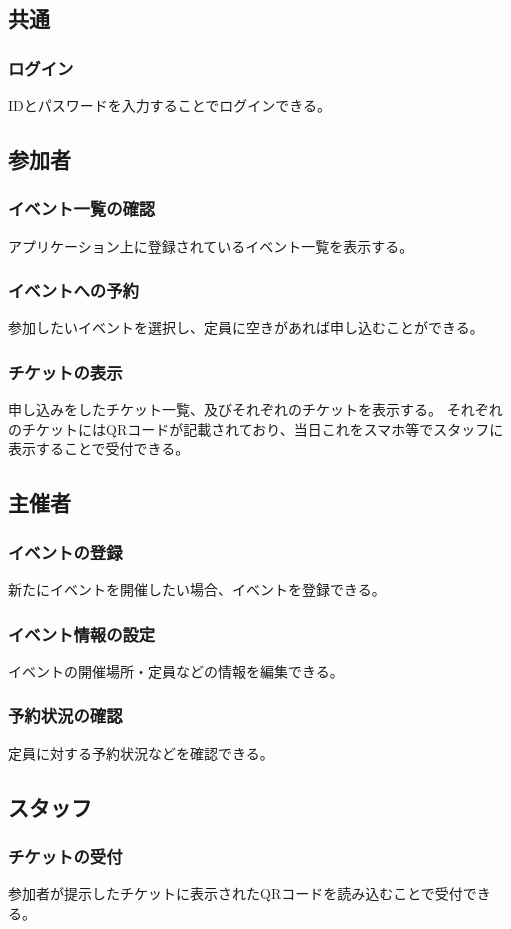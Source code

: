 \documentclass[dvipdfmx]{jarticle}
\begin{document}
\subsection{共通}
\subsubsection{ログイン}
IDとパスワードを入力することでログインできる。
\subsection{参加者}
\subsubsection{イベント一覧の確認}
アプリケーション上に登録されているイベント一覧を表示する。
\subsubsection{イベントへの予約}
参加したいイベントを選択し、定員に空きがあれば申し込むことができる。
\subsubsection{チケットの表示}
申し込みをしたチケット一覧、及びそれぞれのチケットを表示する。
それぞれのチケットにはQRコードが記載されており、当日これをスマホ等でスタッフに表示することで受付できる。
\subsection{主催者}
\subsubsection{イベントの登録}
新たにイベントを開催したい場合、イベントを登録できる。
\subsubsection{イベント情報の設定}
イベントの開催場所・定員などの情報を編集できる。
\subsubsection{予約状況の確認}
定員に対する予約状況などを確認できる。
\subsection{スタッフ}
\subsubsection{チケットの受付}
参加者が提示したチケットに表示されたQRコードを読み込むことで受付できる。
\end{document}

